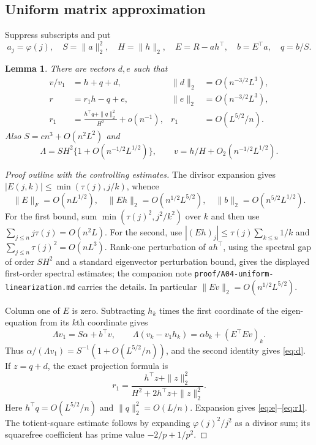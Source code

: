 \documentclass[11pt]{article}
\newtheorem{lemma}[theorem]{Lemma}
\theoremstyle{remark}\newtheorem{remark}[theorem]{Remark}
\begin{document}
\subsection{Uniform matrix approximation}
Suppress subscripts and put
\[
 a_j=\varphi(j),\quad S=\|a\|_2^2,\quad H=\|h\|_2,
 \quad E=R-ah^\top,\quad b=E^\top a,\quad q=b/S.
\]
\begin{lemma}\label{lem:matrix}
There are vectors $d,e$ such that
\begin{align}
 v/v_1&=h+q+d,& \|d\|_2&=O(n^{-3/2}L^3),\label{eq:d}\\
 r&=r_1h-q+e,& \|e\|_2&=O(n^{-3/2}L^3),\label{eq:e}\\
 r_1&=\frac{h^\top q+\|q\|_2^2}{H^2}+o(n^{-1}),&
 r_1&=O(L^{5/2}/n).\label{eq:r1}
\end{align}
Also $S=cn^3+O(n^2L^2)$ and
\[
 \Lambda=SH^2\{1+O(n^{-1/2}L^{1/2})\},\qquad
 v=h/H+O_2(n^{-1/2}L^{1/2}).
\]
\end{lemma}
\begin{proof}[Proof outline with the controlling estimates]
The divisor expansion gives $|E(j,k)|\le\min(\tau(j),j/k)$, whence
\[
 \|E\|_F=O(nL^{1/2}),\quad
 \|Eh\|_2=O(n^{1/2}L^{5/2}),\quad
 \|b\|_2=O(n^{5/2}L^{1/2}).
\]
For the first bound, sum $\min(\tau(j)^2,j^2/k^2)$ over $k$ and then use $\sum_{j\le n}j\tau(j)=O(n^2L)$. For the second, use $|(Eh)_j|\le\tau(j)\sum_{k\le n}1/k$ and $\sum_{j\le n}\tau(j)^2=O(nL^3)$. Rank-one perturbation of $ah^\top$, using the spectral gap of order $SH^2$ and a standard eigenvector perturbation bound, gives the displayed first-order spectral estimates; the companion note \texttt{proof/A04-uniform-linearization.md} carries the details. In particular $\|Ev\|_2=O(n^{1/2}L^{5/2})$.

Column one of $E$ is zero. Subtracting $h_k$ times the first coordinate of the eigen-equation from its $k$th coordinate gives
\[
 \Lambda v_1=S\alpha+b^\top v,\qquad
 \Lambda(v_k-v_1h_k)=\alpha b_k+(E^\top Ev)_k.
\]
Thus $\alpha/(\Lambda v_1)=S^{-1}(1+O(L^{5/2}/n))$, and the second identity gives \eqref{eq:d}. If $z=q+d$, the exact projection formula is
\[
 r_1=\frac{h^\top z+\|z\|_2^2}{H^2+2h^\top z+\|z\|_2^2}.
\]
Here $h^\top q=O(L^{5/2}/n)$ and $\|q\|_2^2=O(L/n)$. Expansion gives \eqref{eq:e}--\eqref{eq:r1}. The totient-square estimate follows by expanding $\varphi(j)^2/j^2$ as a divisor sum; its squarefree coefficient has prime value $-2/p+1/p^2$.
\end{proof}
\end{document}
